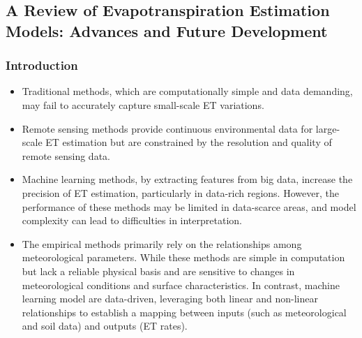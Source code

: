 \documentclass[paper=a4, fontsize=12pt]{scrartcl}
\begin{document}
	\newpage
	\subsection{A Review of Evapotranspiration Estimation Models: Advances and Future Development \citep{xue2025review}}
	\subsubsection{Introduction}
		
	\begin{itemize}
		\item Traditional methods, which are computationally simple and data demanding, may fail to accurately capture small-scale ET variations. 
		\item Remote sensing methods provide continuous environmental data for large-scale ET estimation but are constrained by the resolution and quality of remote sensing data. 
		\item Machine learning methods, by extracting features from big data, increase the precision of ET estimation, particularly in data-rich regions. However, the performance of these methods may be limited in data-scarce areas, and model complexity can lead to difficulties in interpretation.
		\item The empirical methods primarily rely on the relationships among meteorological parameters. While these methods are simple in computation but lack a reliable physical basis and are sensitive to changes in meteorological conditions and surface characteristics. In contrast, machine learning model are data-driven, leveraging both linear and non-linear relationships to establish a mapping between inputs (such as meteorological and soil data) and outputs (ET rates).
	\end{itemize}
	
\end{document}
